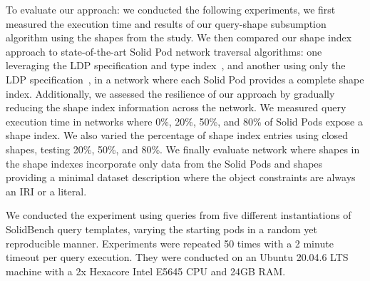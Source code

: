 To evaluate our approach: we conducted the following experiments, we first measured the execution time and results of our query-shape subsumption algorithm using the shapes from the study.
We then compared our shape index approach to state-of-the-art Solid Pod network traversal algorithms: one leveraging the LDP specification and type index~\cite{Taelman2023}, and another using only the LDP specification~\cite{Taelman2023}, in a network where each Solid Pod provides a complete shape index.
Additionally, we assessed the resilience of our approach by gradually reducing the shape index information across the network.  
We measured query execution time in networks where 0\%, 20\%, 50\%, and 80\% of Solid Pods expose a shape index.  
We also varied the percentage of shape index entries using closed shapes, testing 20\%, 50\%, and 80\%.
We finally evaluate network where shapes in the shape indexes incorporate only data from the Solid Pods and shapes providing a minimal dataset description where the object constraints are always an IRI or a literal.

\iffalse
\begin{itemize}
   \item Query execution time in a network where 0\%, 20\%, 50\%, and 80\% of Solid Pods expose a shape index.
   \item Query execution time in a network where of shape indexes with 20\%, 50\%, and 80\% of entries using closed shapes.
   \item Query execution time in a network where shapes in the shape indexes incorporate only data from the Solid Pods and shapes providing a minimal dataset description where the object constraints are always an IRI or a literal.%
\end{itemize}
\fi
We conducted the experiment using queries from five different instantiations of SolidBench query templates, varying the starting pods in a random yet reproducible manner.
Experiments were repeated 50 times with a 2 minute timeout per query execution. 
They were conducted on an Ubuntu 20.04.6 LTS machine with a 2x Hexacore Intel E5645 CPU and 24GB RAM.


